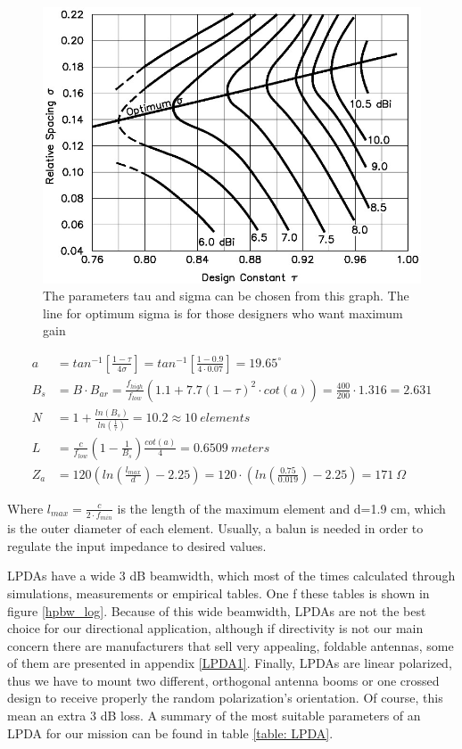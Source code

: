 \begin{figure}[htb]
\centering
\includegraphics[width=1\textwidth]{figures/Yannis/Log_gain}
\caption{The parameters tau and sigma can be chosen from this graph. The line for optimum sigma is for those designers who want maximum gain\cite{balanis,Log}}
\label{log_gain}
\end{figure}

\begin{subequations}
\begin{align}
    a&=tan^{-1}[\frac{1-\tau}{4 \sigma}]=tan^{-1}[\frac{1-0.9}{4 \cdot 0.07}]=19.65^{\circ} \\
    B_{s}&=B \cdot B_{ar}=\frac{f_{high}}{f_{low}} (1.1+7.7(1-\tau)^2 \cdot cot(a))= \frac{400}{200} \cdot 1.316=2.631 \\
    N&=1+\frac{ln(B_{s})}{ln(\frac{1}{\tau})}=10.2 \approx 10 \ elements \\
    L&=\frac{c}{f_{low}} (1-\frac{1}{B_{s}}) \frac{cot(a)}{4}=0.6509 \ meters \\
    Z_{a}&=120(ln(\frac{l_{max}}{d})-2.25)=120 \cdot (ln(\frac{0.75}{0.019})-2.25)=171 \ \Omega
\end{align}
\label{eq: LPDA}
\end{subequations}

\noindent
Where $l_{max}=\frac{c}{2 \cdot f_{min}}$ is the length of the maximum element and d=1.9 cm, which is the outer diameter of each element. Usually, a balun is needed in order to regulate the input impedance to desired values. 

LPDAs have a wide 3 dB beamwidth, which most of the times calculated through simulations, measurements or empirical tables. One f these tables is shown in figure \ref{hpbw_log}. Because of this wide beamwidth, LPDAs are not the best choice for our directional application, although if directivity is not our main concern there are manufacturers that sell very appealing, foldable antennas, some of them are presented in appendix \ref{LPDA1}. Finally, LPDAs are linear polarized, thus we have to mount two different, orthogonal antenna booms or one crossed design to receive properly the random polarization's orientation. Of course, this mean an extra 3 dB loss. A summary of the most suitable parameters of an LPDA for our mission can be found in table \ref{table: LPDA}.

